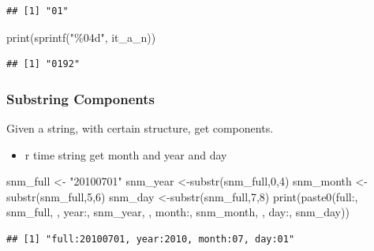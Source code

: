 \documentclass[
]{book}
\newenvironment{Shaded}{\begin{snugshade}}{\end{snugshade}}
\newcommand{\DecValTok}[1]{\textcolor[rgb]{0.00,0.00,0.81}{#1}}
\newcommand{\FunctionTok}[1]{\textcolor[rgb]{0.00,0.00,0.00}{#1}}
\newcommand{\NormalTok}[1]{#1}
\newcommand{\OtherTok}[1]{\textcolor[rgb]{0.56,0.35,0.01}{#1}}
\newcommand{\StringTok}[1]{\textcolor[rgb]{0.31,0.60,0.02}{#1}}
\providecommand{\tightlist}{%
  \setlength{\itemsep}{0pt}\setlength{\parskip}{0pt}}
\begin{document}
\begin{verbatim}
## [1] "01"
\end{verbatim}

\begin{Shaded}
\begin{Highlighting}[]
\FunctionTok{print}\NormalTok{(}\FunctionTok{sprintf}\NormalTok{(}\StringTok{"\%04d"}\NormalTok{, it\_a\_n))}
\end{Highlighting}
\end{Shaded}

\begin{verbatim}
## [1] "0192"
\end{verbatim}

\hypertarget{substring-components}{%
\subsubsection{Substring Components}\label{substring-components}}

Given a string, with certain structure, get components.

\begin{itemize}
\tightlist
\item
  r time string get month and year and day
\end{itemize}

\begin{Shaded}
\begin{Highlighting}[]
\NormalTok{snm\_full }\OtherTok{\textless{}{-}} \StringTok{"20100701"}
\NormalTok{snm\_year }\OtherTok{\textless{}{-}}\FunctionTok{substr}\NormalTok{(snm\_full,}\DecValTok{0}\NormalTok{,}\DecValTok{4}\NormalTok{)}
\NormalTok{snm\_month }\OtherTok{\textless{}{-}}\FunctionTok{substr}\NormalTok{(snm\_full,}\DecValTok{5}\NormalTok{,}\DecValTok{6}\NormalTok{)}
\NormalTok{snm\_day }\OtherTok{\textless{}{-}}\FunctionTok{substr}\NormalTok{(snm\_full,}\DecValTok{7}\NormalTok{,}\DecValTok{8}\NormalTok{)}
\FunctionTok{print}\NormalTok{(}\FunctionTok{paste0}\NormalTok{(}\StringTok{\textquotesingle{}full:\textquotesingle{}}\NormalTok{, snm\_full, }
             \StringTok{\textquotesingle{}, year:\textquotesingle{}}\NormalTok{, snm\_year, }
             \StringTok{\textquotesingle{}, month:\textquotesingle{}}\NormalTok{, snm\_month,}
             \StringTok{\textquotesingle{}, day:\textquotesingle{}}\NormalTok{, snm\_day))}
\end{Highlighting}
\end{Shaded}

\begin{verbatim}
## [1] "full:20100701, year:2010, month:07, day:01"
\end{verbatim}
\end{document}
